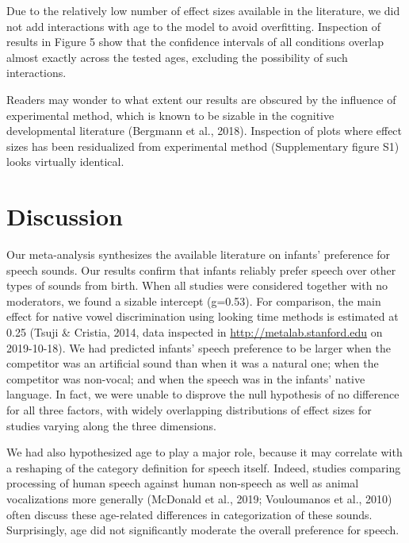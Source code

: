 \documentclass[man,floatsintext]{apa6}
\begin{document}
Due to the relatively low number of effect sizes available in the literature, we did not add interactions with age to the model to avoid overfitting. Inspection of results in Figure 5 show that the confidence intervals of all conditions overlap almost exactly across the tested ages, excluding the possibility of such interactions.

Readers may wonder to what extent our results are obscured by the influence of experimental method, which is known to be sizable in the cognitive developmental literature (Bergmann et al., 2018). Inspection of plots where effect sizes has been residualized from experimental method (Supplementary figure S1) looks virtually identical.

\hypertarget{discussion}{%
\section{Discussion}\label{discussion}}

Our meta-analysis synthesizes the available literature on infants' preference for speech sounds. Our results confirm that infants reliably prefer speech over other types of sounds from birth. When all studies were considered together with no moderators, we found a sizable intercept (g=0.53). For comparison, the main effect for native vowel discrimination using looking time methods is estimated at 0.25 (Tsuji \& Cristia, 2014, data inspected in \url{http://metalab.stanford.edu} on 2019-10-18). We had predicted infants' speech preference to be larger when the competitor was an artificial sound than when it was a natural one; when the competitor was non-vocal; and when the speech was in the infants' native language. In fact, we were unable to disprove the null hypothesis of no difference for all three factors, with widely overlapping distributions of effect sizes for studies varying along the three dimensions.

We had also hypothesized age to play a major role, because it may correlate with a reshaping of the category definition for speech itself. Indeed, studies comparing processing of human speech against human non-speech as well as animal vocalizations more generally (McDonald et al., 2019; Vouloumanos et al., 2010) often discuss these age-related differences in categorization of these sounds. Surprisingly, age did not significantly moderate the overall preference for speech.
\end{document}
